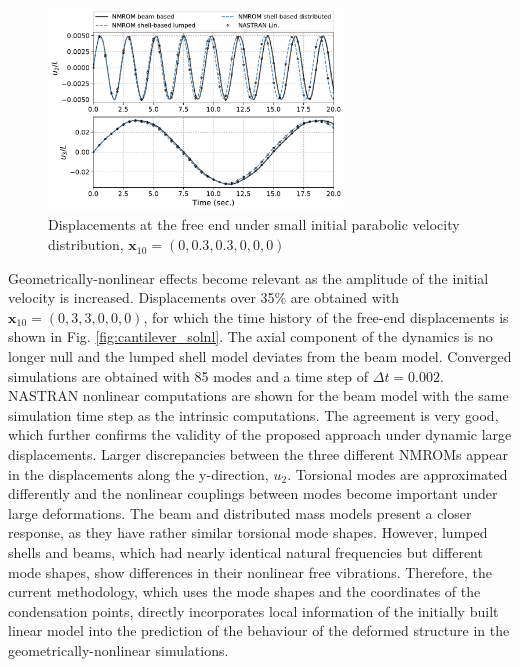 \documentclass[11pt]{article}
\begin{document}
\begin{figure}[h!]
\centering
\includegraphics[width=0.7\textwidth]{./img/cantilever_sollin3}
\caption{Displacements at the free end under small initial parabolic velocity distribution, $\pmb{x}_{10} = (0,0.3,0.3,0,0,0)$}\label{fig:cantilever_sollin}
\end{figure}
Geometrically-nonlinear effects become relevant as the amplitude of the initial velocity is increased. Displacements over 35$\%$ are obtained with $\pmb{x}_{10} = (0,3,3,0,0,0)$, for which the time history of the free-end displacements is shown in Fig. \ref{fig:cantilever_solnl}. The axial component of the dynamics is no longer null and the lumped shell model deviates from the beam model. Converged simulations are obtained with 85 modes and a time step of $\Delta t = 0.002$. NASTRAN nonlinear computations are shown for the beam model with the same simulation time step as the intrinsic computations. The agreement is very good, which further confirms the validity of the proposed approach under dynamic large displacements. Larger discrepancies between the three different NMROMs appear in the displacements along the y-direction, $u_2$. Torsional modes are approximated differently and the nonlinear couplings between modes become important under large deformations. The beam and distributed mass models present a closer response, as they have rather similar torsional mode shapes. However, lumped shells and beams, which had  nearly identical natural frequencies but different mode shapes, show differences in their nonlinear free vibrations. Therefore, the current methodology, which uses the mode shapes and the coordinates of the condensation points, directly incorporates local information of the initially built linear model into the prediction of the behaviour of the deformed structure in the geometrically-nonlinear simulations.
\end{document}

